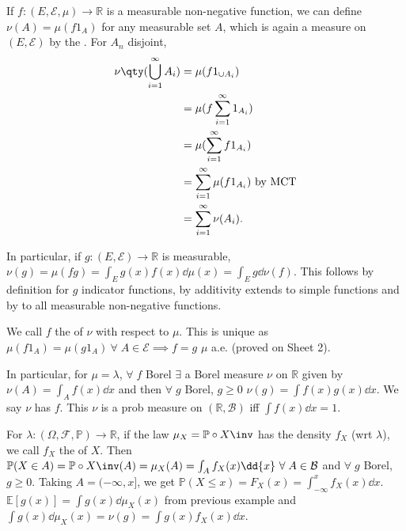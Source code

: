 \begin{example}
	If $f \colon (E, \mathcal E, \mu) \to \mathbb R$ is a measurable non-negative function, we can define $\nu(A) = \mu(f 1_A)$ for any measurable set $A$, which is again a measure on $(E, \mathcal E)$ by the .
	For $A_n$ disjoint,
	\begin{align*}
		\nu\qty(\bigcup_{i=1}^\infty A_i) &= \mu(f 1_{\cup A_i}) \\
		&= \mu(f \sum_{i=1}^{\infty} 1_{A_i}) \\
		&= \mu(\sum_{i=1}^{\infty} f 1_{A_i}) \\
		&= \sum_{i=1}^{\infty} \mu(f 1_{A_i}) \text{ by MCT} \\
		&= \sum_{i=1}^{\infty} \nu(A_i).
	\end{align*}

	In particular, if $g \colon (E, \mathcal E) \to \mathbb R$ is measurable, $\nu(g) = \mu(fg) = \int_E g(x) f(x) \dd{\mu(x)} = \int_E g \dd{\nu(f)}$.
	This follows by definition for $g$ indicator functions, by additivity extends to simple functions and by  to all measurable non-negative functions.

	We call $f$ the  of $\nu$ with respect to $\mu$.
	This is unique as $\mu(f 1_A) = \mu(g 1_A) \ \forall \; A \in \mathcal{E} \implies f = g$ $\mu$ a.e. (proved on Sheet 2).

	In particular, for $\mu = \lambda$, $\forall \; f$ Borel $\exists$ a Borel measure $\nu$ on $\mathbb{R}$ given by $\nu(A) = \int_A f(x) \dd{x}$ and then $\forall \; g$ Borel, $g \geq 0$ $\nu(g) = \int f(x) g(x) \dd{x}$.
	We say $\nu$ has  $f$.
	This $\nu$ is a prob measure on $(\mathbb{R}, \mathcal{B})$ iff $\int f(x) \dd{x} = 1$.

	For $\lambda : (\Omega, \mathcal{F}, \mathbb{P}) \to \mathbb{R}$, if the law $\mu_X = \mathbb{P} \circ X\inv$ has the density $f_X$ (wrt $\lambda$), we call $f_X$ the  of $X$.
	Then $\mathbb{P}(X \in A) = \mathbb{P} \circ X\inv (A) = \mu_X(A) = \int_A f_X(x) \dd{x} \ \forall \; A \in \mathcal{B}$ and $\forall \; g$ Borel, $g \geq 0$.
	Taking $A = (-\infty, x]$, we get $\mathbb{P}(X \leq x) = F_X(x) = \int_{-\infty}^{x} f_X(x) \dd{x}$. \\
	$\mathbb{E}[g(x)] = \int g(x) \dd{\mu_X(x)}$ from previous example and $\int g(x) \dd{\mu_X(x)} = \nu(g) = \int g(x) f_X(x) \dd{x}$.
\end{example}
